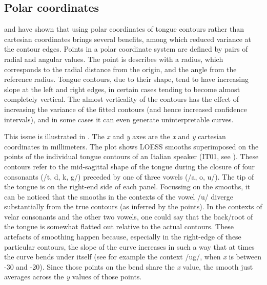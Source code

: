 \documentclass[12pt,]{article}
\begin{document}
\hypertarget{polar-coordinates}{%
\subsection{Polar coordinates}\label{polar-coordinates}}

\citet{mielke2015} and \citet{heyne2015a, heyne2015} have shown that
using polar coordinates of tongue contours rather than cartesian
coordinates brings several benefits, among which reduced variance at the
contour edges. Points in a polar coordinate system are defined by pairs
of radial and angular values. The point is describes with a radius,
which corresponds to the radial distance from the origin, and the angle
from the reference radius. Tongue contours, due to their shape, tend to
have increasing slope at the left and right edges, in certain cases
tending to become almost completely vertical. The almost verticality of
the contours has the effect of increasing the variance of the fitted
contours (and hence increased confidence intervals), and in some cases
it can even generate uninterpretable curves.

This issue is illustrated in . The \emph{x} and \emph{y}
axes are the \emph{x} and \emph{y} cartesian coordinates in millimeters.
The plot shows LOESS smooths superimposed on the points of the
individual tongue contours of an Italian speaker (IT01, see
). These contours refer to the mid-sagittal shape of the
tongue during the closure of four consonants (/t, d, k, g/) preceded by
one of three vowels (/a, o, u/). The tip of the tongue is on the
right-end side of each panel. Focussing on the smooths, it can be
noticed that the smooths in the contexts of the vowel /u/ diverge
substantially from the true contours (as inferred by the points). In the
contexts of velar consonants and the other two vowels, one could say
that the back/root of the tongue is somewhat flatted out relative to the
actual contours. These artefacts of smoothing happen because, especially
in the right-edge of these particular contours, the slope of the curve
increases in such a way that at times the curve bends under itself (see
for example the context /ug/, when \emph{x} is between -30 and -20).
Since those points on the bend share the \emph{x} value, the smooth just
averages across the \emph{y} values of those points.
\end{document}
